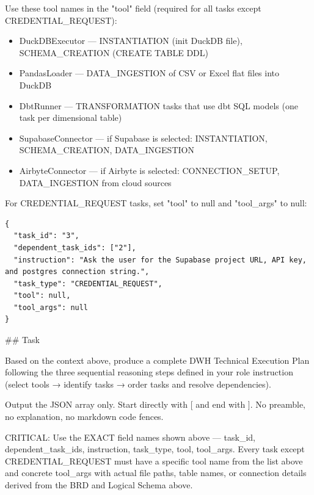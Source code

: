 Use these tool names in the "tool" field (required for all tasks except CREDENTIAL\_REQUEST):
\begin{itemize}
    \item DuckDBExecutor — INSTANTIATION (init DuckDB file), SCHEMA\_CREATION (CREATE TABLE DDL)
    \item PandasLoader — DATA\_INGESTION of CSV or Excel flat files into DuckDB
    \item DbtRunner — TRANSFORMATION tasks that use dbt SQL models (one task per dimensional table)
    \item SupabaseConnector — if Supabase is selected: INSTANTIATION, SCHEMA\_CREATION, DATA\_INGESTION
    \item AirbyteConnector — if Airbyte is selected: CONNECTION\_SETUP, DATA\_INGESTION from cloud sources
\end{itemize}

For CREDENTIAL\_REQUEST tasks, set "tool" to null and "tool\_args" to null:
\newline

\begin{verbatim}
{
  "task_id": "3",
  "dependent_task_ids": ["2"],
  "instruction": "Ask the user for the Supabase project URL, API key, and postgres connection string.",
  "task_type": "CREDENTIAL_REQUEST",
  "tool": null,
  "tool_args": null
}
\end{verbatim}

\#\# Task
\newline

Based on the context above, produce a complete DWH Technical Execution Plan following the three sequential reasoning steps defined in your role instruction (select tools → identify tasks → order tasks and resolve dependencies).
\newline

Output the JSON array only. Start directly with [ and end with ]. No preamble, no explanation, no markdown code fences.
\newline

CRITICAL: Use the EXACT field names shown above — task\_id, dependent\_task\_ids, instruction, task\_type, tool, tool\_args. Every task except CREDENTIAL\_REQUEST must have a specific tool name from the list above and concrete tool\_args with actual file paths, table names, or connection details derived from the BRD and Logical Schema above.
